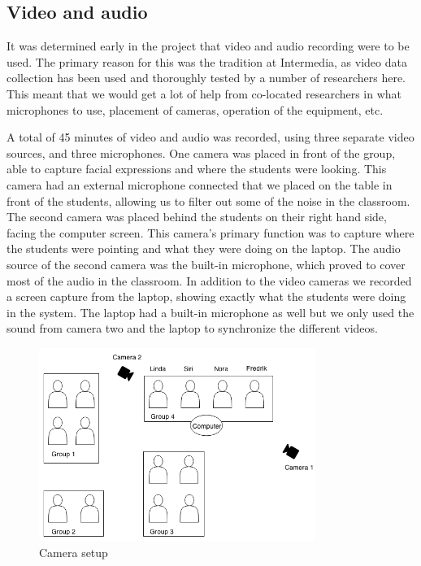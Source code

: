 \subsection{Video and audio}
It was determined early in the project that video and audio recording were to be used. The primary reason for this was the tradition at Intermedia, as video data collection has been used and thoroughly tested by a number of researchers here. This meant that we would get a lot of help from co-located researchers in what microphones to use, placement of cameras, operation of the equipment, etc. 

A total of 45 minutes of video and audio was recorded, using three separate video sources, and three microphones. One camera was placed in front of the group, able to capture facial expressions and where the students were looking. This camera had an external microphone connected that we placed on the table in front of the students, allowing us to filter out some of the noise in the classroom. The second camera was placed behind the students on their right hand side, facing the computer screen. This camera's primary function was to capture where the students were pointing and what they were doing on the laptop. The audio source of the second camera was the built-in microphone, which proved to cover most of the audio in the classroom. In addition to the video cameras we recorded a screen capture from the laptop, showing exactly what the students were doing in the system. The laptop had a built-in microphone as well but we only used the sound from camera two and the laptop to synchronize the different videos.
\begin{figure}
\centering
\includegraphics[width=0.8\textwidth]{img/empiricalsetting/class_diagram.png}
\caption{Camera setup}
\label{fig:camerasetup}
\end{figure}

